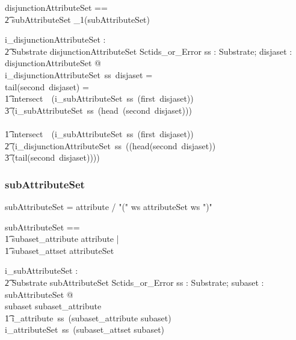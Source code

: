 \documentclass{article}
\def\bnf#1{{\scriptsize {{#1}} }}
\begin{document}
\begin{zed}
disjunctionAttributeSet == \\
\t2 subAttributeSet \cross \seq_1(subAttributeSet)
\end{zed}

\begin{gendef}
    i\_disjunctionAttributeSet : \\
\t2 Substrate \fun disjunctionAttributeSet \fun Sctids\_or\_Error
\where
   \forall ss : Substrate;  disjaset : disjunctionAttributeSet @ \\
i\_disjunctionAttributeSet~ss~disjaset = \\
   \IF tail(second~disjaset) = \langle \rangle \THEN \\
\t1 intersect~~(i\_subAttributeSet~ss~(first~disjaset)) \\
\t3 (i\_subAttributeSet~ss~(head~(second~disjaset))) \\
   \ELSE \\
\t1 intersect~~(i\_subAttributeSet~ss~(first~disjaset)) \\
\t2 (i\_disjunctionAttributeSet~ss~((head(second~disjaset)) \\
\t3 (tail(second~disjaset))))
\end{gendef}

\subsubsection{subAttributeSet}
\begin{framed}
\noindent
\bnf{subAttributeSet = attribute / "(" ws attributeSet ws ")"}
\end{framed}

\begin{zed}
subAttributeSet == \\
\t1 subaset\_attribute \ldata attribute \rdata | \\
\t1 subaset\_attset \ldata attributeSet \rdata
\end{zed}

\begin{gendef}
   i\_subAttributeSet : \\
\t2 Substrate \fun subAttributeSet \fun Sctids\_or\_Error
\where
   \forall ss : Substrate; subaset : subAttributeSet @ \\
   \IF subaset \in \ran subaset\_attribute \\
\t1 \THEN i\_attribute~ss~(subaset\_attribute \inv subaset) \\
  \ELSE i\_attributeSet~ss~(subaset\_attset \inv subaset)
\end{gendef}
\end{document}
